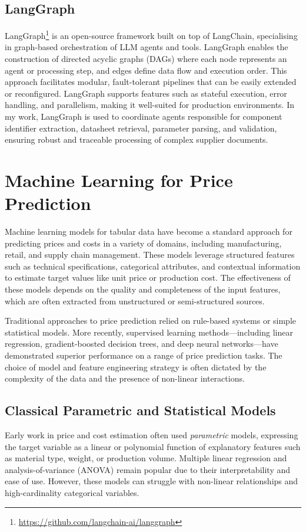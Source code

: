 \subsection{LangGraph}
LangGraph\footnote{\url{https://github.com/langchain-ai/langgraph}} is an open-source framework built on top of LangChain, specialising in graph-based orchestration of LLM agents and tools. LangGraph enables the construction of directed acyclic graphs (DAGs) where each node represents an agent or processing step, and edges define data flow and execution order. This approach facilitates modular, fault-tolerant pipelines that can be easily extended or reconfigured. LangGraph supports features such as stateful execution, error handling, and parallelism, making it well-suited for production environments. In my work, LangGraph is used to coordinate agents responsible for component identifier extraction, datasheet retrieval, parameter parsing, and validation, ensuring robust and traceable processing of complex supplier documents.

\section{Machine Learning for Price Prediction}
Machine learning models for tabular data have become a standard approach for predicting prices and costs in a variety of domains, including manufacturing, retail, and supply chain management. These models leverage structured features such as technical specifications, categorical attributes, and contextual information to estimate target values like unit price or production cost. The effectiveness of these models depends on the quality and completeness of the input features, which are often extracted from unstructured or semi-structured sources.

Traditional approaches to price prediction relied on rule-based systems or simple statistical models. More recently, supervised learning methods—including linear regression, gradient-boosted decision trees, and deep neural networks—have demonstrated superior performance on a range of price prediction tasks. The choice of model and feature engineering strategy is often dictated by the complexity of the data and the presence of non-linear interactions.

\subsection{Classical Parametric and Statistical Models}
Early work in price and cost estimation often used \emph{parametric} models, expressing the target variable as a linear or polynomial function of explanatory features such as material type, weight, or production volume. Multiple linear regression and analysis-of-variance (ANOVA) remain popular due to their interpretability and ease of use. However, these models can struggle with non-linear relationships and high-cardinality categorical variables.

